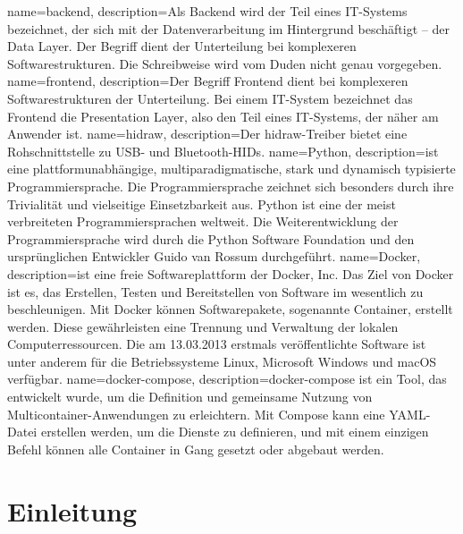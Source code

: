 \documentclass[a4paper,
    12pt,
    headings=small,
    ngerman,
    listof=totoc,
    numbers=noenddot]{scrreprt}[2021/11/13]
\begin{document}
{
  name=backend,
  description={Als Backend wird der Teil eines IT-Systems bezeichnet, der sich mit der Datenverarbeitung im Hintergrund beschäftigt – der Data Layer. Der Begriff dient der Unterteilung bei komplexeren Softwarestrukturen. Die Schreibweise wird vom Duden nicht genau vorgegeben. \autocite{backend_definition}}
}
{
  name=frontend,
  description={Der Begriff Frontend dient bei komplexeren Softwarestrukturen der Unterteilung. Bei einem IT-System bezeichnet das Frontend die Presentation Layer, also den Teil eines IT-Systems, der näher am Anwender ist. \autocite{frontend_definition}}
}
{
  name=hidraw,
  description={Der hidraw-Treiber bietet eine Rohschnittstelle zu USB- und Bluetooth-\ac{HIDs}.}
}
{
  name=Python,
  description={ist eine plattformunabhängige, multiparadigmatische, stark und dynamisch typisierte Programmiersprache.
      Die Programmiersprache zeichnet sich besonders durch ihre Trivialität und vielseitige Einsetzbarkeit aus.
      Python ist eine der meist verbreiteten Programmiersprachen weltweit.
      Die Weiterentwicklung der Programmiersprache wird durch die Python Software Foundation und den ursprünglichen Entwickler Guido van Rossum durchgeführt. \autocite{python}}
}
{
  name=Docker,
  description={ist eine freie Softwareplattform der Docker, Inc. Das Ziel von Docker ist es, das Erstellen, Testen und Bereitstellen von Software im wesentlich zu beschleunigen.
      Mit Docker können Softwarepakete, sogenannte Container, erstellt werden. Diese gewährleisten eine Trennung und Verwaltung der lokalen Computerressourcen.
      Die am 13.03.2013 erstmals veröffentlichte Software ist unter anderem für die Betriebssysteme Linux, Microsoft Windows und macOS verfügbar. \autocite{docker_setup} \autocite{docker_install}}
}
{
  name=docker-compose,
  description={docker-compose ist ein Tool, das entwickelt wurde, um die Definition und gemeinsame Nutzung von Multicontainer-Anwendungen zu erleichtern. Mit Compose kann eine YAML-Datei erstellen werden, um die Dienste zu definieren, und mit einem einzigen Befehl können alle Container in Gang gesetzt oder abgebaut werden. \autocite{docker_install}}
}

\newpage


\chapter{Einleitung}
\end{document}
